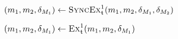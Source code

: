 \begin{algorithmic}[1]
        \algindentskip
            \State \Return{$\bot$}
        \EndIf
        \algblockskip

         \label{algo:synchronization:execute_synchronizing_bidirectional_transformation:line:synchronizationstart}
            \State $(\model{m}{1}, \model{m}{2}, \change{\metamodel{M}{1}}) \leftarrow \function{SyncEx}_\transformation{t}^1(\model{m}{1}, \model{m}{2}, \change{\metamodel{M}{1}}, \change{\metamodel{M}{2}})$
                \State \Return{$\bot$} \label{algo:synchronization:execute_synchronizing_bidirectional_transformation:line:returnbot1}
            \EndIf
        \EndIf \label{algo:synchronization:execute_synchronizing_bidirectional_transformation:line:synchronizationend}
        \algblockskip

            \State $(\model{m}{1}, \model{m}{2}, \change{\metamodel{M}{1}}) \leftarrow \function{Ex}_\transformation{t}^1(\model{m}{1}, \model{m}{2}, \change{\metamodel{M}{1}})$
                \State \Return{$\bot$} \label{algo:execute_synchronizing_bidirectional_transformation:line:returnbot2}
            \EndIf
        \EndWhile
        \algblockskip

        \State {} \label{algo:synchronization:execute_synchronizing_bidirectional_transformation:line:returnresult}
        \algindentskip
    \EndProcedure
\end{algorithmic}